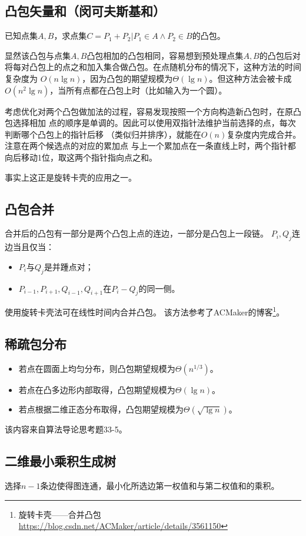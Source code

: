 \subsection{凸包矢量和（闵可夫斯基和）}
已知点集$A,B$，求点集$C={P_1+P_2|P_1\in A \land P_2\in B}$的凸包。

显然该凸包与点集$A,B$凸包相加的凸包相同，容易想到预处理点集$A,B$的凸包后对
将每对凸包上的点之和加入集合做凸包。在点随机分布的情况下，这种方法的时间复杂度为
$O(n \lg n)$，因为凸包的期望规模为$\Theta(\lg n)$。但这种方法会被卡成
$O(n^2 \lg n)$，当所有点都在凸包上时（比如输入为一个圆）。

考虑优化对两个凸包做加法的过程，容易发现按照一个方向构造新凸包时，在原凸包选择相加
点的顺序是单调的。因此可以使用双指针法维护当前选择的点，每次判断哪个凸包上的指针后移
（类似归并排序），就能在$O(n)$复杂度内完成合并。注意在两个候选点的对应的累加点
与上一个累加点在一条直线上时，两个指针都向后移动1位，取这两个指针指向点之和。

事实上这正是旋转卡壳的应用之一。
\subsection{凸包合并}
合并后的凸包有一部分是两个凸包上点的连边，一部分是凸包上一段链。
$P_i,Q_j$连边当且仅当：
\begin{itemize}
	\item $P_i$与$Q_j$是并踵点对；
	\item $P_{i-1},P_{i+1},Q_{i-1},Q_{i+1}$在$P_i-Q_j$的同一侧。
\end{itemize}
使用旋转卡壳法可在线性时间内合并凸包。
该方法参考了ACMaker的博客\footnote{
	旋转卡壳——合并凸包
	\url{https://blog.csdn.net/ACMaker/article/details/3561150}
}。
\subsection{稀疏包分布}
\begin{itemize}
	\item 若点在圆面上均匀分布，则凸包期望规模为$\Theta(n^{1/3})$。
	\item 若点在凸多边形内部取得，凸包期望规模为$\Theta(\lg n)$。
	\item 若点根据二维正态分布取得，凸包期望规模为$\Theta(\sqrt{\lg n})$。
\end{itemize}
该内容来自算法导论\cite{ITA3}思考题33-5。
\subsection{二维最小乘积生成树}
选择$n-1$条边使得图连通，最小化所选边第一权值和与第二权值和的乘积。

